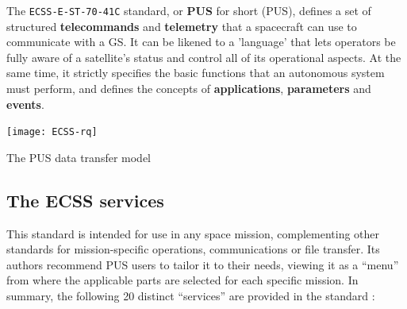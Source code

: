 \documentclass[a4paper,nobib]{tufte-book}
\begin{document}
The \texttt{ECSS-E-ST-70-41C} standard, or \textbf{\acs{PUS}} for short (\acl{PUS}), defines a set of structured \textbf{telecommands} and \textbf{telemetry} that a spacecraft can use to communicate with a \acl{GS}. It can be likened to a 'language' that lets operators be fully aware of a satellite's status and control all of its operational aspects. At the same time, it strictly specifies the basic functions that an autonomous system must perform, and defines the concepts of \textbf{applications}, \textbf{parameters} and \textbf{events}.

\begin{marginfigure}
	\texttt{[image: ECSS-rq]}
	\caption{The \ac{PUS} data transfer model}
	\label{fig:pusmodel}
\end{marginfigure}

\subsection{The \acs{ECSS} services}

This standard is intended for use in any space mission, complementing other standards for mission-specific operations, communications or file transfer. Its authors recommend \acs{PUS} users to tailor it to their needs, viewing it as a ``menu'' from where the applicable parts are selected for each specific mission. In summary, the following 20 distinct ``services'' are provided in the standard \autocite{ECSS-E-ST-70-41C,ECSS-E-70-41A,kaufeler_esa_standard_1994}:

\end{document}
